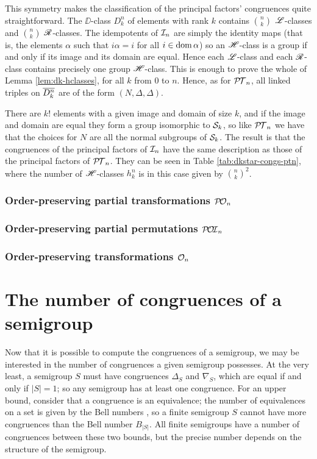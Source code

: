 This symmetry makes the classification of the principal factors' congruences
quite straightforward.  The $\DD$-class $D_k^n$ of elements with rank $k$
contains $\binom{n}{k}$ $\mathrel{\mathscr{L}}$-classes and $\binom{n}{k}$ $\mathrel{\mathscr{R}}$-classes.  The
idempotents of $\mathcal{I}_n$ are simply the identity maps (that is, the elements
$\alpha$ such that $i\alpha = i$ for all $i \in \operatorname{dom}\alpha$) so an $\mathrel{\mathscr{H}}$-class
is a group if and only if its image and its domain are equal.  Hence each
$\mathrel{\mathscr{L}}$-class and each $\mathrel{\mathscr{R}}$-class contains precisely one group $\mathrel{\mathscr{H}}$-class.  This
is enough to prove the whole of Lemma \ref{lem:dk-hclasses}, for all $k$ from
$0$ to $n$.  Hence, as for $\mathcal{P\!T}_n$, all linked triples on $\overline{D_k^n}$ are of
the form $(N, \Delta, \Delta)$.

There are $k!$ elements with a given image and domain of size $k$, and if the
image and domain are equal they form a group isomorphic to $\mathcal{S}_k$, so like
$\mathcal{P\!T}_n$ we have that the choices for $N$ are all the normal subgroups of
$\mathcal{S}_k$.  The result is that the congruences of the principal factors of $\mathcal{I}_n$
have the same description as those of the principal factors of $\mathcal{P\!T}_n$.  They
can be seen in Table \ref{tab:dkstar-congs-ptn}, where the number of
$\mathrel{\mathscr{H}}$-classes $h_k^n$ is in this case given by $\binom{n}{k}^2$.

\subsubsection{Order-preserving partial transformations $\mathcal{P\!O}_n$}
\label{sec:princfact-on}
\cite{pon}

\subsubsection{Order-preserving partial permutations $\mathcal{P\!O\!I}_n$}
\label{sec:princfact-poin}

\subsubsection{Order-preserving transformations $\mathcal{O}_n$}
\label{sec:princfact-on}




\section{The number of congruences of a semigroup}
\label{sec:nrcongs}

Now that it is possible to compute the congruences of a semigroup, we may be
interested in the number of congruences a given semigroup possesses.  At the
very least, a semigroup $S$ must have congruences $\Delta_S$ and $\nabla_S$,
which are equal if and only if $|S| = 1$; so any semigroup has at least one
congruence.  For an upper bound, consider that a congruence is an equivalence;
the number of equivalences on a set is given by the Bell numbers
, so a finite semigroup $S$ cannot have more congruences than
the Bell number $B_{|S|}$.  All finite semigroups have a number of congruences
between these two bounds, but the precise number depends on the structure of the
semigroup.

